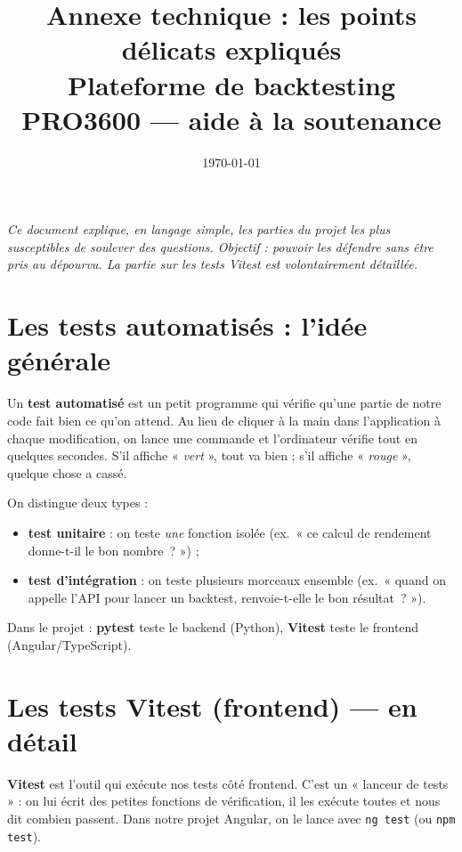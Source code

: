 \documentclass[11pt,a4paper]{article}
\title{\vspace{-1.5cm}\textbf{Annexe technique : les points délicats expliqués}\\[2pt]
\large Plateforme de backtesting PRO3600 --- aide à la soutenance}
\author{}
\date{\today}
\newcommand{\code}[1]{\texttt{#1}}
\begin{document}
\maketitle
\vspace{-0.8cm}

\noindent\textit{Ce document explique, en langage simple, les parties du projet
les plus susceptibles de soulever des questions. Objectif : pouvoir les défendre
sans être pris au dépourvu. La partie sur les tests Vitest est volontairement
détaillée.}

\section{Les tests automatisés : l'idée générale}
Un \textbf{test automatisé} est un petit programme qui vérifie qu'une partie de
notre code fait bien ce qu'on attend. Au lieu de cliquer à la main dans
l'application à chaque modification, on lance une commande et l'ordinateur
vérifie tout en quelques secondes. S'il affiche « \emph{vert} », tout va bien ;
s'il affiche « \emph{rouge} », quelque chose a cassé.

On distingue deux types :
\begin{itemize}[leftmargin=1.4em,nosep]
  \item \textbf{test unitaire} : on teste \emph{une} fonction isolée
        (ex.\ « ce calcul de rendement donne-t-il le bon nombre~? ») ;
  \item \textbf{test d'intégration} : on teste plusieurs morceaux ensemble
        (ex.\ « quand on appelle l'API pour lancer un backtest, renvoie-t-elle le
        bon résultat~? »).
\end{itemize}
Dans le projet : \textbf{pytest} teste le backend (Python), \textbf{Vitest} teste
le frontend (Angular/TypeScript).

\section{Les tests Vitest (frontend) --- en détail}
\textbf{Vitest} est l'outil qui exécute nos tests côté frontend. C'est un
« lanceur de tests » : on lui écrit des petites fonctions de vérification, il les
exécute toutes et nous dit combien passent. Dans notre projet Angular, on le
lance avec \code{ng test} (ou \code{npm test}).
\end{document}
